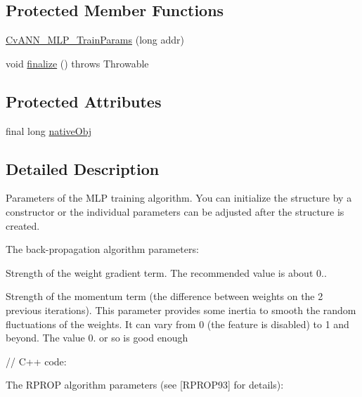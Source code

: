 \subsection*{Protected Member Functions}
\begin{DoxyCompactItemize}
\item 
\mbox{\hyperlink{classorg_1_1opencv_1_1ml_1_1_cv_a_n_n___m_l_p___train_params_a7c707d35771b5cdb3eeb45d02294b461}{Cv\+A\+N\+N\+\_\+\+M\+L\+P\+\_\+\+Train\+Params}} (long addr)
\item 
void \mbox{\hyperlink{classorg_1_1opencv_1_1ml_1_1_cv_a_n_n___m_l_p___train_params_af70816a3f58d6b4749c1227ec81f9e21}{finalize}} ()  throws Throwable 
\end{DoxyCompactItemize}
\subsection*{Protected Attributes}
\begin{DoxyCompactItemize}
\item 
final long \mbox{\hyperlink{classorg_1_1opencv_1_1ml_1_1_cv_a_n_n___m_l_p___train_params_ad58dfe8f1997544f47a7462cfb940b0b}{native\+Obj}}
\end{DoxyCompactItemize}


\subsection{Detailed Description}
Parameters of the M\+LP training algorithm. You can initialize the structure by a constructor or the individual parameters can be adjusted after the structure is created.

The back-\/propagation algorithm parameters\+:

Strength of the weight gradient term. The recommended value is about 0..

Strength of the momentum term (the difference between weights on the 2 previous iterations). This parameter provides some inertia to smooth the random fluctuations of the weights. It can vary from 0 (the feature is disabled) to 1 and beyond. The value 0. or so is good enough {\ttfamily }

{\ttfamily }

{\ttfamily }

{\ttfamily // C++ code\+:}

{\ttfamily }

{\ttfamily }

{\ttfamily The R\+P\+R\+OP algorithm parameters (see \mbox{[}R\+P\+R\+O\+P93\mbox{]} for details)\+:}

